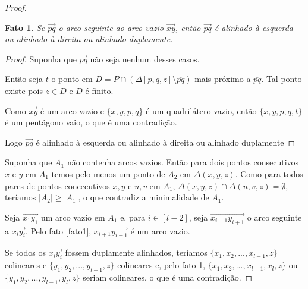\documentclass[a4paper]{book}
\newtheorem{fato}{Fato}
\begin{document}
\begin{proof}

    \begin{fato}\label{fato2}
        Se $\overrightarrow{pq}$ o arco seguinte ao arco vazio $\overrightarrow{xy}$, então $\overrightarrow{pq}$ é alinhado à esquerda ou alinhado à direita ou alinhado duplamente.
    \end{fato}
    \begin{proof}
        Suponha que $\overrightarrow{pq}$ não seja nenhum desses casos.

        Então seja $t$ o ponto em $D=P\cap(\Delta[p,q,z]\setminus\overline{pq})$ mais próximo a $\overline{pq}$. Tal ponto existe pois $z\in D$ e $D$ é finito.

        Como $\overrightarrow{xy}$ é um arco vazio e $\{x,y,p,q\}$ é um quadrilátero vazio, então $\{x,y,p,q,t\}$ é um pentágono vaio, o que é uma contradição.

        Logo $\overrightarrow{pq}$ é alinhado à esquerda ou alinhado à direita ou alinhado duplamente
    \end{proof}
    Suponha que $A_1$ não contenha arcos vazios. Então para dois pontos consecutivos $x$ e $y$ em $A_1$ temos pelo menos um ponto de $A_2$ em $\Delta(x,y,z)$. Como para todos pares de pontos concecutivos $x,y$ e $u,v$ em $A_1$, $\Delta(x,y,z)\cap\Delta(u,v,z)=\emptyset$, teríamos $|A_2|\geq|A_1|$, o que contradiz a minimalidade de $A_1$.

    Seja $\overrightarrow{x_1y_1}$ um arco vazio em $A_1$ e, para $i\in[l-2]$, seja $\overrightarrow{x_{i+1}y_{i+1}}$ o arco seguinte a $\overrightarrow{x_iy_i}$. Pelo fato \ref{fato1}, $\overrightarrow{x_{i+1}y_{i+1}}$ é um arco vazio.

    Se todos os $\overrightarrow{x_iy_i}$ fossem duplamente alinhados, teríamos $\{x_1,x_2,...,x_{l-1},z\}$ colineares e $\{y_1,y_2,...,y_{l-1},z\}$ colineares e, pelo fato \ref{fato2}, $\{x_1,x_2,...,x_{l-1},x_l,z\}$ ou $\{y_1,y_2,...,y_{l-1},y_l,z\}$ seriam colineares, o que é uma contradição.


\end{proof}
\end{document}
